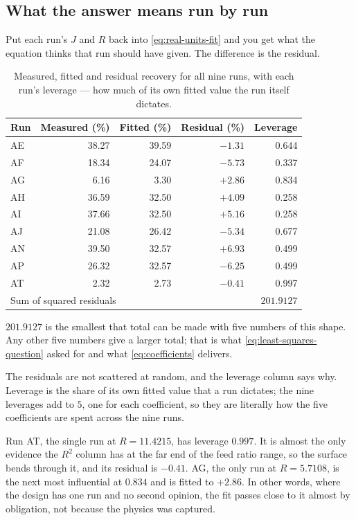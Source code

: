\subsection{What the answer means run by run}

Put each run's $J$ and $R$ back into \eqref{eq:real-units-fit} and you get what the equation
thinks that run should have given. The difference is the residual.

\begin{table}[htbp]
  \centering
  \caption{Measured, fitted and residual recovery for all nine runs, with each run's
    leverage --- how much of its own fitted value the run itself dictates.}
  \label{tab:fitted-and-residuals}
  \begin{tabular}{lrrrr}
    \toprule
    Run & Measured (\%) & Fitted (\%) & Residual (\%) & Leverage \\
    \midrule
    AE & 38.27 & 39.59 & $-1.31$ & 0.644 \\
    AF & 18.34 & 24.07 & $-5.73$ & 0.337 \\
    AG & 6.16  & 3.30  & $+2.86$ & 0.834 \\
    AH & 36.59 & 32.50 & $+4.09$ & 0.258 \\
    AI & 37.66 & 32.50 & $+5.16$ & 0.258 \\
    AJ & 21.08 & 26.42 & $-5.34$ & 0.677 \\
    AN & 39.50 & 32.57 & $+6.93$ & 0.499 \\
    AP & 26.32 & 32.57 & $-6.25$ & 0.499 \\
    AT & 2.32  & 2.73  & $-0.41$ & 0.997 \\
    \midrule
    \multicolumn{3}{l}{Sum of squared residuals} & \multicolumn{2}{r}{$201.9127$} \\
    \bottomrule
  \end{tabular}
\end{table}

$201.9127$ is the smallest that total can be made with five numbers of this shape. Any other
five numbers give a larger total; that is what \eqref{eq:least-squares-question} asked for and
what \eqref{eq:coefficients} delivers.

The residuals are not scattered at random, and the leverage column says why. Leverage is the
share of its own fitted value that a run dictates; the nine leverages add to $5$, one for each
coefficient, so they are literally how the five coefficients are spent across the nine runs.

Run AT, the single run at $R = 11.4215$, has leverage $0.997$. It is almost the only evidence
the $R^2$ column has at the far end of the feed ratio range, so the surface bends through it,
and its residual is $-0.41$. AG, the only run at $R = 5.7108$, is the next most influential at
$0.834$ and is fitted to $+2.86$. In other words, where the design has one run and no second
opinion, the fit passes close to it almost by obligation, not because the physics was captured.

